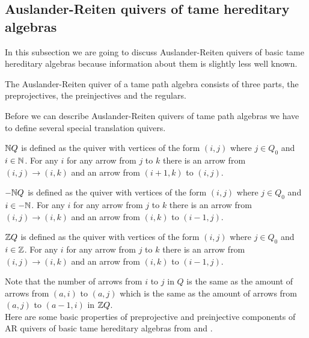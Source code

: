 \subsection{Auslander-Reiten quivers of tame hereditary algebras}
\indent In this subsection we are going to discuss Auslander-Reiten quivers of basic tame hereditary algebras because information about them is slightly less well known.\\
\begin{theorem}
\indent \cite{DR76} The Auslander-Reiten quiver of a tame path algebra consists of three parts, the preprojectives, the preinjectives and the regulars.
\end{theorem}
\indent Before we can describe Auslander-Reiten quivers of tame path algebras we have to define several special translation quivers.\\
\begin{definition}
$\mathbb{N} Q$ is defined as the quiver with vertices of the form $(i,j)$ where $j\in Q_0$ and $i\in\mathbb{N}$. For any $i$ for any arrow from $j$ to $k$ there is an arrow from $(i,j)\to (i,k)$ and an arrow from $(i + 1,k)$ to $(i,j)$.
\end{definition}
\begin{definition}
$-\mathbb{N} Q$ is defined as the quiver with vertices of the form $(i,j)$ where $j\in Q_0$ and $i\in -\mathbb{N}$. For any $i$ for any arrow from $j$ to $k$ there is an arrow from $(i,j)\to (i,k)$ and an arrow from $(i,k)$ to $(i - 1,j)$.
\end{definition}
\begin{definition}
$\mathbb{Z} Q$ is defined as the quiver with vertices of the form $(i,j)$ where $j\in Q_0$ and $i\in\mathbb{Z}$. For any $i$ for any arrow from $j$ to $k$ there is an arrow from $(i,j)\to (i,k)$ and an arrow from $(i,k)$ to $(i - 1,j)$.
\end{definition}
\indent Note that the number of arrows from $i$ to $j$ in $Q$ is the same as the amount of arrows from $(a,i)$ to $(a,j)$ which is the same as the amount of arrows from $(a,j)$ to $(a-1,i)$ in $\mathbb{Z} Q$.\\
\indent Here are some basic properties of preprojective and preinjective components of AR quivers of basic tame hereditary algebras from \cite{ASS06} and \cite{SS06}.
